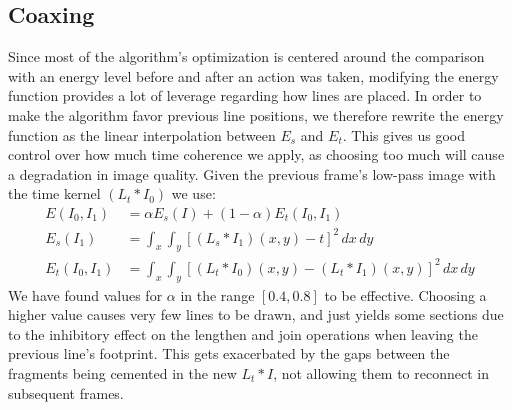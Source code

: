 \subsection{Coaxing}
Since most of the algorithm's optimization is centered around the comparison with an energy level before and after an action was taken,
modifying the energy function provides a lot of leverage regarding how lines are placed. 
In order to make the algorithm favor previous line positions, we therefore rewrite the energy function as the linear
interpolation between $E_s$ and $E_t$. This gives us good control over how much time coherence we apply, as choosing too much will cause a degradation in image quality.
Given the previous frame's low-pass image with the time kernel $(L_t\ast I_0)$ we use:
\begin{equation*}
    \begin{split}
        E(I_0, I_1) &= \alpha E_s(I)+(1-\alpha)E_t(I_0, I_1)\\
        E_s(I_1)      &= \int_x\int_y\left[(L_s\ast I_1)(x,y)-t\right]^2\,dx\,dy\\
        E_t(I_0, I_1)  &= \int_x\int_y\left[(L_t\ast I_0)(x,y)-(L_t\ast I_1)(x,y)\right]^2\,dx\,dy
    \end{split}
\end{equation*}
We have found values for $\alpha$ in the range $[0.4, 0.8]$ to be effective.
Choosing a higher value causes very few lines to be drawn, and just yields some sections due to the inhibitory effect on the lengthen and join operations when leaving the previous line's footprint.
This gets exacerbated by the gaps between the fragments being cemented in the new $L_t\ast I$, not allowing them to reconnect in subsequent frames.

